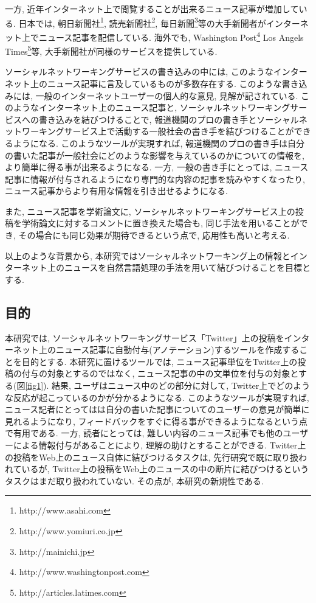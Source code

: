 \documentclass[12pt]{jarticle}
\begin{document}
一方, 近年インターネット上で閲覧することが出来るニュース記事が増加している. 日本では, 朝日新聞社\footnote{http://www.asahi.com}, 読売新聞社\footnote{http://www.yomiuri.co.jp}, 毎日新聞\footnote{http://mainichi.jp}等の大手新聞者がインターネット上でニュース記事を配信している. 海外でも, Washington Post\footnote{http://www.washingtonpost.com} Los Angels Times\footnote{http://articles.latimes.com}等, 大手新聞社が同様のサービスを提供している.

ソーシャルネットワーキングサービスの書き込みの中には, このようなインターネット上のニュース記事に言及しているものが多数存在する. このような書き込みには, 一般のインターネットユーザーの個人的な意見, 見解が記されている. このようなインターネット上のニュース記事と, ソーシャルネットワーキングサービスへの書き込みを結びつけることで, 報道機関のプロの書き手とソーシャルネットワーキングサービス上で活動する一般社会の書き手を結びつけることができるようになる. このようなツールが実現すれば, 報道機関のプロの書き手は自分の書いた記事が一般社会にどのような影響を与えているのかについての情報を, より簡単に得る事が出来るようになる. 一方, 一般の書き手にとっては, ニュース記事に情報が付与されるようになり専門的な内容の記事を読みやすくなったり, ニュース記事からより有用な情報を引き出せるようになる.

また, ニュース記事を学術論文に, ソーシャルネットワーキングサービス上の投稿を学術論文に対するコメントに置き換えた場合も, 同じ手法を用いることができ, その場合にも同じ効果が期待できるという点で, 応用性も高いと考える.

以上のような背景から, 本研究ではソーシャルネットワーキング上の情報とインターネット上のニュースを自然言語処理の手法を用いて結びつけることを目標とする.

\clearpage

\subsection{目的}
本研究では, ソーシャルネットワーキングサービス「Twitter」上の投稿をインターネット上のニュース記事に自動付与(アノテーション)するツールを作成することを目的とする. 本研究に置けるツールでは, ニュース記事単位をTwitter上の投稿の付与の対象とするのではなく, ニュース記事の中の文単位を付与の対象とする(図\ref{fig1}). 結果, ユーザはニュース中のどの部分に対して, Twitter上でどのような反応が起こっているのかが分かるようになる. このようなツールが実現すれば, ニュース記者にとってはは自分の書いた記事についてのユーザーの意見が簡単に見れるようになり, フィードバックをすぐに得る事ができるようになるという点で有用である. 一方, 読者にとっては, 難しい内容のニュース記事でも他のユーザーによる情報付与があることにより, 理解の助けとすることができる. Twitter上の投稿をWeb上のニュース自体に結びつけるタスクは, 先行研究で既に取り扱われているが, Twitter上の投稿をWeb上のニュースの中の断片に結びつけるというタスクはまだ取り扱われていない. その点が, 本研究の新規性である.
\end{document}
